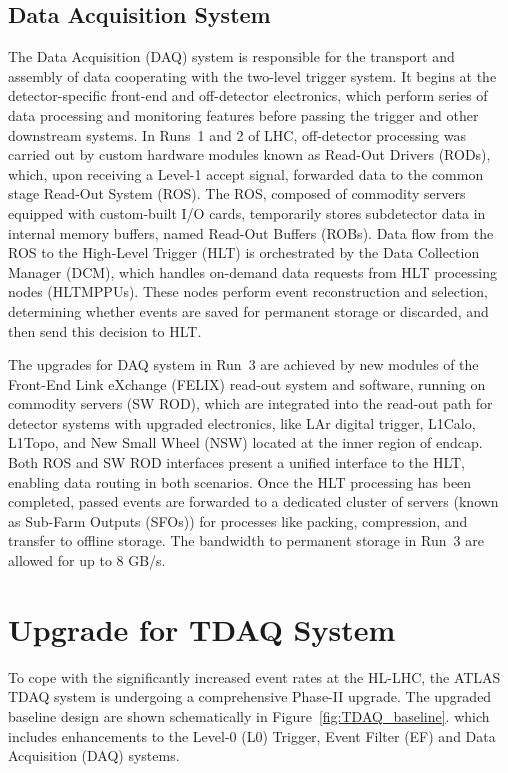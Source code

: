 \subsection{Data Acquisition System}
The Data Acquisition (DAQ) system is responsible for the transport and assembly of data cooperating with the two-level trigger system. It begins at the detector-specific front-end and off-detector electronics, which perform series of data processing and monitoring features before passing the trigger and other downstream systems. In Runs~1 and 2 of LHC, off-detector processing was carried out by custom hardware modules known as Read-Out Drivers (RODs), which, upon receiving a Level-1 accept signal, forwarded data to the common stage Read-Out System (ROS). The ROS, composed of commodity servers equipped with custom-built I/O cards, temporarily stores subdetector data in internal memory buffers, named Read-Out Buffers (ROBs). Data flow from the ROS to the High-Level Trigger (HLT) is orchestrated by the Data Collection Manager (DCM), which handles on-demand data requests from HLT processing nodes (HLTMPPUs). These nodes perform event reconstruction and selection, determining whether events are saved for permanent storage or discarded, and then send this decision to HLT. 

The upgrades for DAQ system in Run~3 are achieved by new modules of the Front-End Link eXchange (FELIX) read-out system and software, running on commodity servers (SW ROD), which are integrated into the read-out path for detector systems with upgraded electronics, like LAr digital trigger, L1Calo, L1Topo, and New Small Wheel (NSW) located at the inner region of endcap. Both ROS and SW ROD interfaces present a unified interface to the HLT, enabling data routing in both scenarios. Once the HLT processing has been completed, passed events are forwarded to a dedicated cluster of servers (known as Sub-Farm Outputs (SFOs)) for processes like packing, compression, and transfer to offline storage. The bandwidth to permanent storage in Run~3 are allowed for up to 8 GB/s.

\section{Upgrade for TDAQ System} \label{sec:TDAQUpgrade}
To cope with the significantly increased event rates at the HL-LHC, the ATLAS TDAQ system is undergoing a comprehensive Phase-II upgrade. The upgraded baseline design are shown schematically in Figure~\ref{fig:TDAQ_baseline}. which includes enhancements to the Level-0 (L0) Trigger, Event Filter (EF) and Data Acquisition (DAQ) systems.

